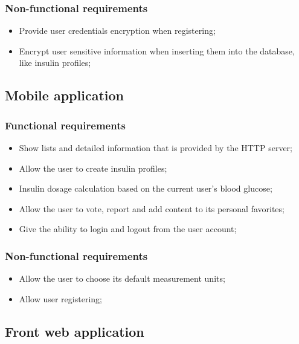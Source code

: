 \subsubsection{Non-functional requirements}

\begin{itemize}
    \item Provide user credentials encryption when registering;
    \item Encrypt user sensitive information when inserting them into the database, like insulin profiles;
\end{itemize}

\subsection{Mobile application}

\subsubsection{Functional requirements}

\begin{itemize}
    \item Show lists and detailed information that is provided by the HTTP server;
    \item Allow the user to create insulin profiles;
    \item Insulin dosage calculation based on the current user's blood glucose;
    \item Allow the user to vote, report and add content to its personal favorites;
    \item Give the ability to login and logout from the user account;
\end{itemize}

\subsubsection{Non-functional requirements}

\begin{itemize}
    \item Allow the user to choose its default measurement units;
    \item Allow user registering;
\end{itemize}

\subsection{Front web application}

